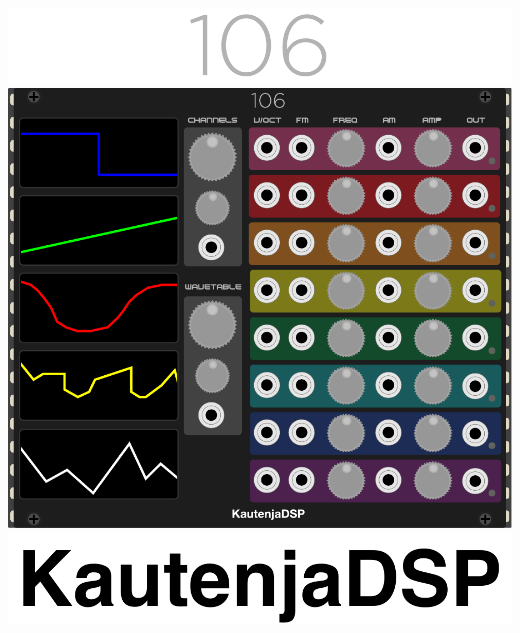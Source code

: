 \documentclass[12pt,a4paper]{article}
\begin{document}

\thispagestyle{empty}
\vspace*{\fill}
\begin{center}
\includegraphics{106-Logo}
\linebreak\linebreak\linebreak\linebreak
\includegraphics{106-Module}
\linebreak\linebreak\linebreak\linebreak
\includegraphics{KautenjaDSP}
\end{center}
\vspace*{\fill}
\clearpage

\end{document}
